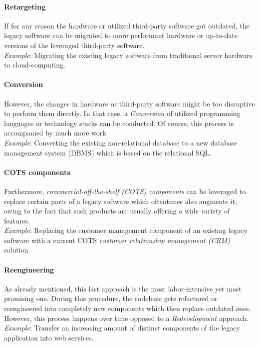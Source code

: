 \documentclass[12pt,a4paper,twoside]{report}
\begin{document}
\paragraph{Retargeting}
If for any reason the hardware or utilized third-party software got outdated,
the legacy software can be migrated to more performant hardware or
up-to-date versions of the leveraged third-party software.\\
\textit{Example}: Migrating the existing legacy software from traditional server
hardware to cloud-computing.

\paragraph{Conversion}
However, the changes in hardware or third-party software might be too disruptive
to perform them directly. In that case, a \textit{Conversion} of utilized
programming languages or technology stacks can be conducted.
Of course, this process is accompanied by much more work.\\
\textit{Example}: Converting the existing non-relational database to a
new database management system (DBMS) which is based on the relational SQL.

\paragraph{COTS components}
Furthermore, \textit{commercial-off-the-shelf (COTS) components} can be
leveraged to replace certain parts of a legacy software which oftentimes also
augments it, owing to the fact that such products are usually offering a wide
variety of features.\\
\textit{Example}: Replacing the customer management component of an existing
legacy software with a current COTS \textit{customer relationship management (CRM)} solution.

\paragraph{Reengineering}
As already mentioned, this last approach is the most labor-intensive yet most promising one.
During this procedure, the codebase gets refactored or reengineered
into completely new components which then replace outdated ones.
However, this process happens over time opposed to a \textit{Redevelopment} approach.\\
\textit{Example}: Transfer an increasing amount of distinct components
of the legacy application into web services.
\end{document}
